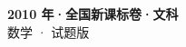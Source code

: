 \documentclass[zihao=-4, a4paper]{ctexart}
\begin{document}
\begin{center}
  {\Large\bfseries 2010 年·全国新课标卷·文科}\\[4pt]
  {\large 数学 · 试题版}
\end{center}
\medskip
{}

\end{document}
